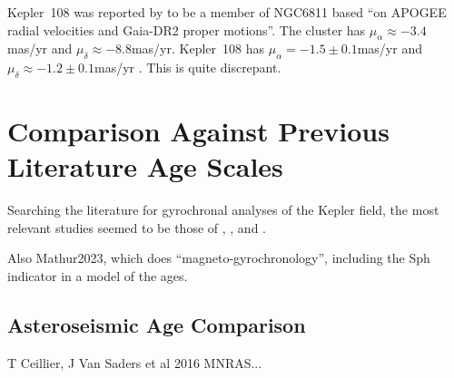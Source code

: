 \documentclass[11pt,twocolumn,tighten]{aastex63}
\begin{document}
Kepler~108 was reported by \citet{2020ApJ...903...55P} to be a member
of NGC6811 based ``on APOGEE radial velocities and Gaia-DR2 proper
motions''.  The cluster has $\mu_\alpha\approx-3.4$mas/yr and
$\mu_\delta \approx -8.8$mas/yr.  Kepler~108 has
$\mu_\alpha=-1.5\pm0.1$mas/yr and $\mu_\delta \approx
-1.2\pm0.1$mas/yr \citep{Gaia_DR3_2022}.  This is quite discrepant.






\section{Comparison Against Previous Literature Age Scales}
Searching the literature for gyrochronal analyses of the Kepler field,
the most relevant studies seemed to be those of
\citet{Walkowicz_2013}, \citet{Reinhold_2015}, and 
\citet{David_2021}.

Also Mathur2023, which does ``magneto-gyrochronology'', including the
Sph indicator in a model of the ages.


\subsection{Asteroseismic Age Comparison}
T Ceillier, J Van Saders et al 2016 MNRAS...



%

\clearpage
\listofchanges
\end{document}
